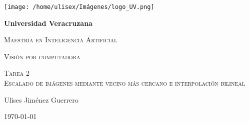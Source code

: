 \begin{titlepage}
	\centering
	{\texttt{[image: /home/ulisex/Imágenes/logo\_UV.png]}\par}
	\vspace{1cm}
	{\bfseries\LARGE Universidad Veracruzana \par}
	\vspace{1cm}
	{\scshape\Large Maestría en Inteligencia Artificial \par}
	{\scshape\Large Visión por computadora \par}
	\vspace{3cm}
	{\scshape\Large Tarea 2 \\
		Escalado de imágenes mediante vecino más cercano e 
		interpolación bilineal\par} 
	\vspace{3cm}
	{\itshape\Large  \par}
	\vfill
	{\Large Ulises Jiménez Guerrero\par}
	\vfill		
	{\Large \today \par}
\end{titlepage} 
